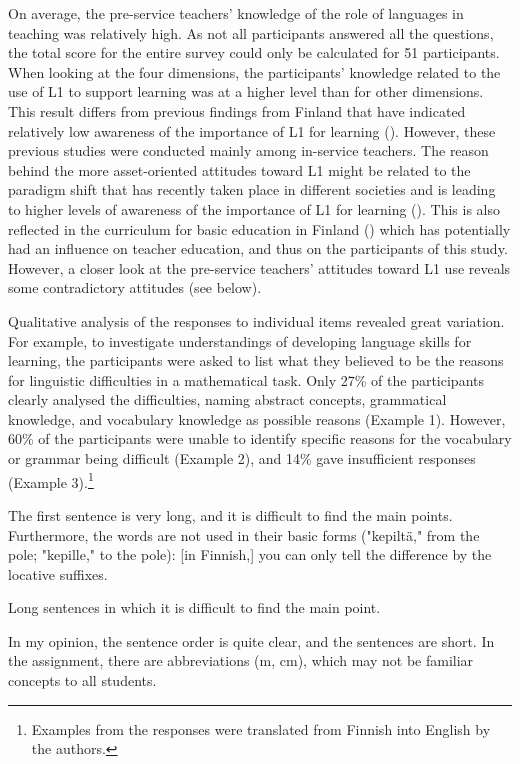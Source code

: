 \documentclass[output=paper]{langscibook}
\begin{document}
On average, the pre-service teachers’ knowledge of the role of languages in teaching was relatively high. As not all participants answered all the questions, the total score for the entire survey could only be calculated for 51 participants. When looking at the four dimensions, the participants’ knowledge related to the use of L1 to support learning was at a higher level than for other dimensions. This result differs from previous findings from Finland that have indicated relatively low awareness of the importance of L1 for learning (\citealt{AlisaariEtAl2019,HeikkolaEtAl2022,Repo2020}). However, these previous studies were conducted mainly among in-service teachers. The reason behind the more asset-oriented attitudes toward L1 might be related to the paradigm shift that has recently taken place in different societies and is leading to higher levels of awareness of the importance of L1 for learning (\citealt{AroninSingleton2018}). This is also reflected in the curriculum for basic education in Finland (\citealt{Finnish_national_agency_of_education2014}) which has potentially had an influence on teacher education, and thus on the participants of this study. However, a closer look at the pre-service teachers’ attitudes toward L1 use reveals some contradictory attitudes (see below).

Qualitative analysis of the responses to individual items revealed great variation. For example, to investigate understandings of developing language skills for learning, the participants were asked to list what they believed to be the reasons for linguistic difficulties in a mathematical task. Only 27\% of the participants clearly analysed the difficulties, naming abstract concepts, grammatical knowledge, and vocabulary knowledge as possible reasons (Example 1). However, 60\% of the participants were unable to identify specific reasons for the vocabulary or grammar being difficult (Example 2), and 14\% gave insufficient responses (Example 3).\footnote{Examples from the responses were translated from Finnish into English by the authors.}

\ea
The first sentence is very long, and it is difficult to find the main points. Furthermore, the words are not used in their basic forms ("kepiltä," from the pole; "kepille," to the pole): [in Finnish,] you can only tell the difference by the locative suffixes.

\ex Long sentences in which it is difficult to find the main point. 

\ex In my opinion, the sentence order is quite clear, and the sentences are short. In the assignment, there are abbreviations (m, cm), which may not be familiar concepts to all students. 
\z
\end{document}
